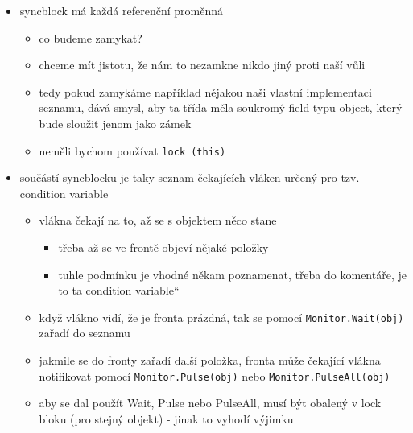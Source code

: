 \begin{itemize}
\begin{itemize}
\begin{itemize}
\item existuje syntaktická zkratka \texttt{lock(\allowbreak{}obj)\allowbreak{} \allowbreak{}\{ \allowbreak{}... \allowbreak{}\}\allowbreak{}}, na začátku bloku se volá Enter, na konci se volá Exit
\item zámek si v syncblocku ukládá referenci na vlákno, které ho vlastní (jinak je tam null)
\item pokud ho zamkneme ze stejného vlákna několikrát, musíme ho několikrát odemknout (k tomu má počítadlo)
\end{itemize}
\item syncblock má každá referenční proměnná
\begin{itemize}
\item co budeme zamykat?
\item chceme mít jistotu, že nám to nezamkne nikdo jiný proti naší vůli
\item tedy pokud zamykáme například nějakou naši vlastní implementaci seznamu, dává smysl, aby ta třída měla soukromý field typu object, který bude sloužit jenom jako zámek
\item neměli bychom používat \texttt{lock \allowbreak{}(\allowbreak{}this)\allowbreak{}}
\end{itemize}
\item součástí syncblocku je taky seznam čekajících vláken určený pro tzv. condition variable
\begin{itemize}
\item vlákna čekají na to, až se s objektem něco stane
\begin{itemize}
\item třeba až se ve frontě objeví nějaké položky
\item tuhle podmínku je vhodné někam poznamenat, třeba do komentáře, je to ta \quotedblbase{}condition variable\textquotedblleft{}
\end{itemize}
\item když vlákno vidí, že je fronta prázdná, tak se pomocí \texttt{Monitor.\allowbreak{}Wait(\allowbreak{}obj)\allowbreak{}} zařadí do seznamu
\item jakmile se do fronty zařadí další položka, fronta může čekající vlákna notifikovat pomocí \texttt{Monitor.\allowbreak{}Pulse(\allowbreak{}obj)\allowbreak{}} nebo \texttt{Monitor.\allowbreak{}PulseAll(\allowbreak{}obj)\allowbreak{}}
\item aby se dal použít Wait, Pulse nebo PulseAll, musí být obalený v lock bloku (pro stejný objekt) - jinak to vyhodí výjimku
\end{itemize}

\end{itemize}
\end{itemize}
